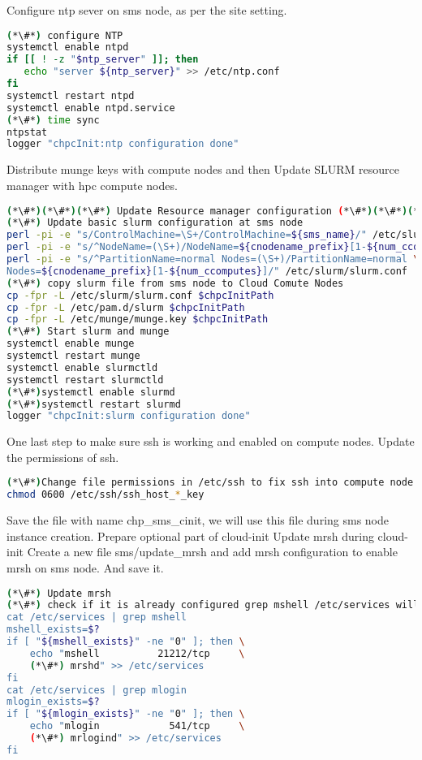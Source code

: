 Configure ntp sever on sms node, as per the site setting.


\begin{lstlisting}[language=bash,keywords={}]
(*\#*) configure NTP
systemctl enable ntpd
if [[ ! -z "$ntp_server" ]]; then
   echo "server ${ntp_server}" >> /etc/ntp.conf
fi
systemctl restart ntpd
systemctl enable ntpd.service
(*\#*) time sync
ntpstat
logger "chpcInit:ntp configuration done"
\end{lstlisting}

Distribute munge keys with compute nodes and then Update SLURM resource manager with hpc compute nodes.


\begin{lstlisting}[language=bash,keywords={}]
(*\#*)(*\#*)(*\#*) Update Resource manager configuration (*\#*)(*\#*)(*\#*)
(*\#*) Update basic slurm configuration at sms node
perl -pi -e "s/ControlMachine=\S+/ControlMachine=${sms_name}/" /etc/slurm/slurm.conf
perl -pi -e "s/^NodeName=(\S+)/NodeName=${cnodename_prefix}[1-${num_ccomputes}]/" /etc/slurm/slurm.conf
perl -pi -e "s/^PartitionName=normal Nodes=(\S+)/PartitionName=normal \
Nodes=${cnodename_prefix}[1-${num_ccomputes}]/" /etc/slurm/slurm.conf
(*\#*) copy slurm file from sms node to Cloud Comute Nodes
cp -fpr -L /etc/slurm/slurm.conf $chpcInitPath
cp -fpr -L /etc/pam.d/slurm $chpcInitPath
cp -fpr -L /etc/munge/munge.key $chpcInitPath
(*\#*) Start slurm and munge 
systemctl enable munge
systemctl restart munge
systemctl enable slurmctld
systemctl restart slurmctld
(*\#*)systemctl enable slurmd
(*\#*)systemctl restart slurmd
logger "chpcInit:slurm configuration done"
\end{lstlisting}


One last step to make sure ssh is working and enabled on compute nodes. Update the permissions of ssh.


\begin{lstlisting}[language=bash,keywords={}]
(*\#*)Change file permissions in /etc/ssh to fix ssh into compute node
chmod 0600 /etc/ssh/ssh_host_*_key
\end{lstlisting}

Save the file with name chp\_sms\_cinit, we will use this file during sms node instance creation.
Prepare optional part of cloud-init
Update mrsh during cloud-init 
Create a new file sms/update\_mrsh and add mrsh configuration to enable mrsh on sms node. And save it. 


\begin{lstlisting}[language=bash,keywords={}]
(*\#*) Update mrsh
(*\#*) check if it is already configured grep mshell /etc/services will return non-zero, else configure"
cat /etc/services | grep mshell
mshell_exists=$?
if [ "${mshell_exists}" -ne "0" ]; then \
    echo "mshell          21212/tcp     \             
    (*\#*) mrshd" >> /etc/services
fi
cat /etc/services | grep mlogin
mlogin_exists=$?
if [ "${mlogin_exists}" -ne "0" ]; then \
    echo "mlogin            541/tcp     \
    (*\#*) mrlogind" >> /etc/services
fi
\end{lstlisting}


